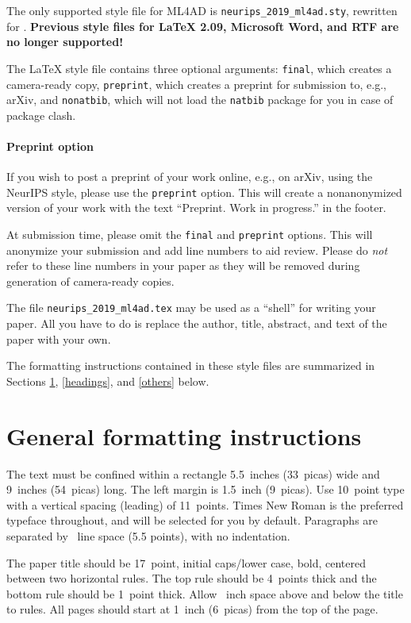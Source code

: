 \documentclass{article}
\begin{document}
The only supported style file for ML4AD is \verb+neurips_2019_ml4ad.sty+,
rewritten for \LaTeXe{}.  \textbf{Previous style files for \LaTeX{} 2.09,
  Microsoft Word, and RTF are no longer supported!}

The \LaTeX{} style file contains three optional arguments: \verb+final+, which
creates a camera-ready copy, \verb+preprint+, which creates a preprint for
submission to, e.g., arXiv, and \verb+nonatbib+, which will not load the
\verb+natbib+ package for you in case of package clash.

\paragraph{Preprint option}
If you wish to post a preprint of your work online, e.g., on arXiv, using the
NeurIPS style, please use the \verb+preprint+ option. This will create a
nonanonymized version of your work with the text ``Preprint. Work in progress.''
in the footer. 

At submission time, please omit the \verb+final+ and \verb+preprint+
options. This will anonymize your submission and add line numbers to aid
review. Please do \emph{not} refer to these line numbers in your paper as they
will be removed during generation of camera-ready copies.

The file \verb+neurips_2019_ml4ad.tex+ may be used as a ``shell'' for writing your
paper. All you have to do is replace the author, title, abstract, and text of
the paper with your own.

The formatting instructions contained in these style files are summarized in
Sections \ref{gen_inst}, \ref{headings}, and \ref{others} below.

\section{General formatting instructions}
\label{gen_inst}

The text must be confined within a rectangle 5.5~inches (33~picas) wide and
9~inches (54~picas) long. The left margin is 1.5~inch (9~picas).  Use 10~point
type with a vertical spacing (leading) of 11~points.  Times New Roman is the
preferred typeface throughout, and will be selected for you by default.
Paragraphs are separated by ~line space (5.5 points), with no
indentation.

The paper title should be 17~point, initial caps/lower case, bold, centered
between two horizontal rules. The top rule should be 4~points thick and the
bottom rule should be 1~point thick. Allow ~inch space above and
below the title to rules. All pages should start at 1~inch (6~picas) from the
top of the page.
\end{document}
